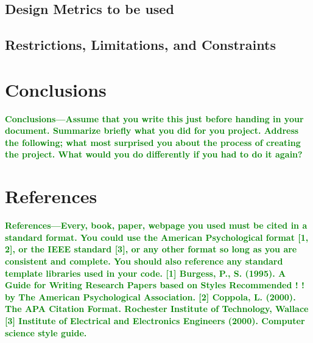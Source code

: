 \documentclass{article}
\numberwithin{equation}{section} %
\begin{document}
\subsection{Design Metrics to be used}

\subsection{Restrictions, Limitations, and Constraints}

\section{Conclusions}
\textcolor{green}{\bf Conclusions—Assume that you write this just before handing in your document. 
Summarize brieﬂy what you did for you project. Address the following; what most 
surprised you about the process of creating the project. What would you do 
differently if you had to do it again?}

\section{References}
\textcolor{green}{\bf References—Every, book, paper, webpage you used must be cited in a standard 
format. You could use the American Psychological format [1, 2], or the IEEE 
standard [3], or any other format so long as you are consistent and complete. You 
should also reference any standard template libraries used in your code. 
[1]  Burgess, P., S. (1995). A Guide for Writing Research Papers based on Styles Recommended 
! ! by The American Psychological Association. 
[2]  Coppola, L. (2000). The APA Citation Format. Rochester Institute of Technology, Wallace 
[3]  Institute of Electrical and Electronics Engineers (2000). Computer science style guide.  
}
\end{document}
